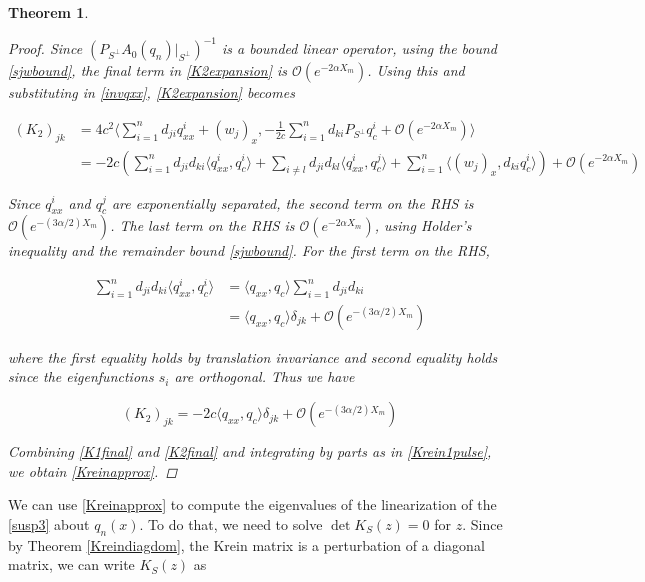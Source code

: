 \documentclass[12pt]{article}
\newtheorem{theorem}{Theorem}
\begin{document}
\begin{theorem}
\begin{proof}
Since $(P_{S^\perp} A_0(q_n)|_{S^\perp})^{-1}$ is a bounded linear operator, using the bound \eqref{sjwbound}, the final term in \eqref{K2expansion} is $\mathcal{O}(e^{-2 \alpha X_m})$. Using this and substituting in \eqref{invqxx}, \eqref{K2expansion} becomes

\begin{align*}
(K_2)_{jk} 
&= 4 c^2 \langle \sum_{i = 1}^{n} d_{ji} q^i_{xx} + (w_j)_x, 
-\frac{1}{2c}\sum_{i = 1}^{n} d_{ki} P_{S^\perp} q^i_c + \mathcal{O}(e^{-2 \alpha X_m}) \rangle \\
&= -2 c \left( \sum_{i = 1}^{n} d_{ji} d_{ki} \langle q^i_{xx}, q^i_c \rangle
+ \sum_{i\neq l} d_{ji} d_{kl} \langle q^i_{xx}, q^j_c \rangle
+ \sum_{i=1}^n \langle (w_j)_x, d_{ki} q^i_c \rangle \right) + \mathcal{O}(e^{-2 \alpha X_m})
\end{align*}

Since $q^i_{xx}$ and $q^j_c$ are exponentially separated, the second term on the RHS is $\mathcal{O}(e^{-(3 \alpha/2) X_m})$. The last term on the RHS is $\mathcal{O}(e^{-2 \alpha X_m})$, using Holder's inequality and the remainder bound \eqref{sjwbound}. For the first term on the RHS,

\begin{align*}
\sum_{i = 1}^{n} d_{ji} d_{ki} \langle q^i_{xx}, q^i_c \rangle
&= \langle q_{xx}, q_c \rangle \sum_{i = 1}^{n} d_{ji} d_{ki} \\
&= \langle q_{xx}, q_c \rangle \delta_{jk} + \mathcal{O}(e^{-(3 \alpha/2) X_m})
\end{align*}

where the first equality holds by translation invariance and second equality holds since the eigenfunctions $s_i$ are orthogonal. Thus we have

\begin{equation}\label{K2final}
(K_2)_{jk} 
= -2 c \langle q_{xx}, q_c \rangle \delta_{jk} + \mathcal{O}(e^{-(3 \alpha/2) X_m})
\end{equation}

Combining \eqref{K1final} and \eqref{K2final} and integrating by parts as in \eqref{Krein1pulse}, we obtain \eqref{Kreinapprox}.

\end{proof}
\end{theorem}

We can use \eqref{Kreinapprox} to compute the eigenvalues of the linearization of the \eqref{susp3} about $q_n(x)$. To do that, we need to solve $\det K_S(z) = 0$ for $z$. Since by Theorem \ref{Kreindiagdom}, the Krein matrix is a perturbation of a diagonal matrix, we can write $K_S(z)$ as 
\end{document}
